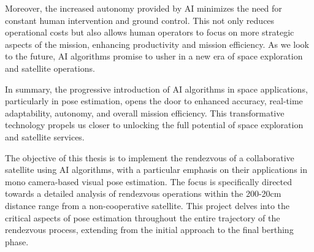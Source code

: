 Moreover, the increased autonomy provided by AI minimizes the need for constant human intervention and ground control. This not only reduces operational costs but also allows human operators to focus on more strategic aspects of the mission, enhancing productivity and mission efficiency. As we look to the future, AI algorithms promise to usher in a new era of space exploration and satellite operations.

In summary, the progressive introduction of AI algorithms in space applications, particularly in pose estimation, opens the door to enhanced accuracy, real-time adaptability, autonomy, and overall mission efficiency. This transformative technology propels us closer to unlocking the full potential of space exploration and satellite services.

The objective of this thesis is to implement the rendezvous of a collaborative satellite using AI algorithms, with a particular emphasis on their applications in mono camera-based visual pose estimation. The focus is specifically directed towards a detailed analysis of rendezvous operations within the 200-20cm distance range from a non-cooperative satellite. This project delves into the critical aspects of pose estimation throughout the entire trajectory of the rendezvous process, extending from the initial approach to the final berthing phase.
